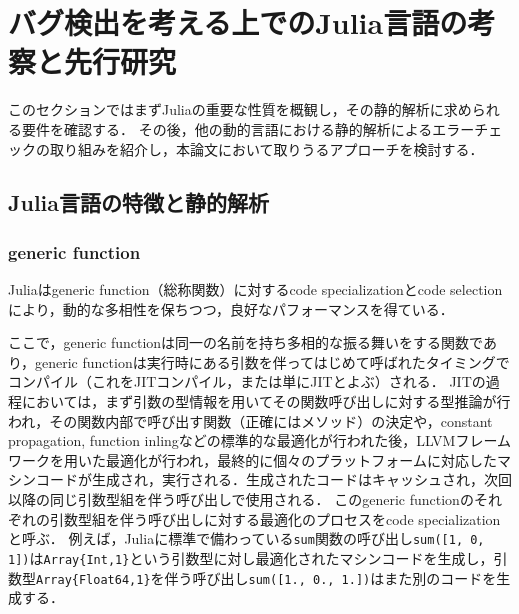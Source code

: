
\section{バグ検出を考える上でのJulia言語の考察と先行研究}

このセクションではまずJuliaの重要な性質を概観し，その静的解析に求められる要件を確認する．
その後，他の動的言語における静的解析によるエラーチェックの取り組みを紹介し，本論文において取りうるアプローチを検討する．

\subsection{Julia言語の特徴と静的解析}


\subsubsection{generic function}

Juliaはgeneric function（総称関数）に対するcode specializationとcode selectionにより，動的な多相性を保ちつつ，良好なパフォーマンスを得ている．

ここで，generic functionは同一の名前を持ち多相的な振る舞いをする関数であり，generic functionは実行時にある引数を伴ってはじめて呼ばれたタイミングでコンパイル（これをJITコンパイル，または単にJITとよぶ）される．
JITの過程においては，まず引数の型情報を用いてその関数呼び出しに対する型推論が行われ，その関数内部で呼び出す関数（正確にはメソッド）の決定や，constant propagation, function inlingなどの標準的な最適化が行われた後，LLVMフレームワーク\cite{LLVM}を用いた最適化が行われ，最終的に個々のプラットフォームに対応したマシンコードが生成され，実行される．生成されたコードはキャッシュされ，次回以降の同じ引数型組を伴う呼び出しで使用される．
このgeneric functionのそれぞれの引数型組を伴う呼び出しに対する最適化のプロセスをcode specializationと呼ぶ．
例えば，Juliaに標準で備わっている\texttt{sum}関数の呼び出し\texttt{sum([1, 0, 1])}は\texttt{Array\{Int,1\}}という引数型に対し最適化されたマシンコードを生成し，引数型\texttt{Array\{Float64,1\}}を伴う呼び出し\texttt{sum([1., 0., 1.])}はまた別のコードを生成する．

